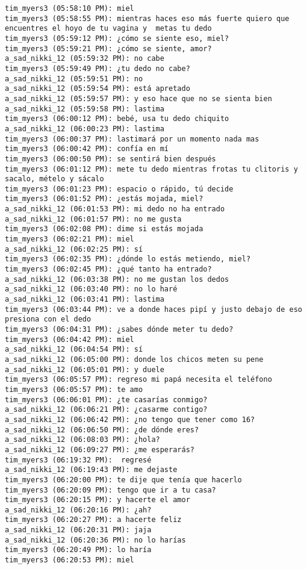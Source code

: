 \begin{verbatim}
tim_myers3 (05:58:10 PM): miel
tim_myers3 (05:58:55 PM): mientras haces eso más fuerte quiero que encuentres el hoyo de tu vagina y  metas tu dedo 
tim_myers3 (05:59:12 PM): ¿cómo se siente eso, miel?
tim_myers3 (05:59:21 PM): ¿cómo se siente, amor?
a_sad_nikki_12 (05:59:32 PM): no cabe
tim_myers3 (05:59:49 PM): ¿tu dedo no cabe? 
a_sad_nikki_12 (05:59:51 PM): no
a_sad_nikki_12 (05:59:54 PM): está apretado
a_sad_nikki_12 (05:59:57 PM): y eso hace que no se sienta bien
a_sad_nikki_12 (05:59:58 PM): lastima
tim_myers3 (06:00:12 PM): bebé, usa tu dedo chiquito
a_sad_nikki_12 (06:00:23 PM): lastima
tim_myers3 (06:00:37 PM): lastimará por un momento nada mas
tim_myers3 (06:00:42 PM): confía en mí
tim_myers3 (06:00:50 PM): se sentirá bien después 
tim_myers3 (06:01:12 PM): mete tu dedo mientras frotas tu clitoris y sacalo, mételo y sácalo
tim_myers3 (06:01:23 PM): espacio o rápido, tú decide
tim_myers3 (06:01:52 PM): ¿estás mojada, miel?
a_sad_nikki_12 (06:01:53 PM): mi dedo no ha entrado
a_sad_nikki_12 (06:01:57 PM): no me gusta
tim_myers3 (06:02:08 PM): dime si estás mojada 
tim_myers3 (06:02:21 PM): miel
a_sad_nikki_12 (06:02:25 PM): sí
tim_myers3 (06:02:35 PM): ¿dónde lo estás metiendo, miel?
tim_myers3 (06:02:45 PM): ¿qué tanto ha entrado?
a_sad_nikki_12 (06:03:38 PM): no me gustan los dedos
a_sad_nikki_12 (06:03:40 PM): no lo haré
a_sad_nikki_12 (06:03:41 PM): lastima
tim_myers3 (06:03:44 PM): ve a donde haces pipí y justo debajo de eso presiona con el dedo
tim_myers3 (06:04:31 PM): ¿sabes dónde meter tu dedo?
tim_myers3 (06:04:42 PM): miel
a_sad_nikki_12 (06:04:54 PM): sí
a_sad_nikki_12 (06:05:00 PM): donde los chicos meten su pene
a_sad_nikki_12 (06:05:01 PM): y duele
tim_myers3 (06:05:57 PM): regreso mi papá necesita el teléfono
tim_myers3 (06:05:57 PM): te amo
tim_myers3 (06:06:01 PM): ¿te casarías conmigo?
a_sad_nikki_12 (06:06:21 PM): ¿casarme contigo?
a_sad_nikki_12 (06:06:42 PM): ¿no tengo que tener como 16?
a_sad_nikki_12 (06:06:50 PM): ¿de dónde eres?
a_sad_nikki_12 (06:08:03 PM): ¿hola?
a_sad_nikki_12 (06:09:27 PM): ¿me esperarás?
tim_myers3 (06:19:32 PM):  regresé
a_sad_nikki_12 (06:19:43 PM): me dejaste
tim_myers3 (06:20:00 PM): te dije que tenía que hacerlo
tim_myers3 (06:20:09 PM): tengo que ir a tu casa?
tim_myers3 (06:20:15 PM): y hacerte el amor 
a_sad_nikki_12 (06:20:16 PM): ¿ah?
tim_myers3 (06:20:27 PM): a hacerte feliz
a_sad_nikki_12 (06:20:31 PM): jaja
a_sad_nikki_12 (06:20:36 PM): no lo harías
tim_myers3 (06:20:49 PM): lo haría 
tim_myers3 (06:20:53 PM): miel
\end{verbatim}